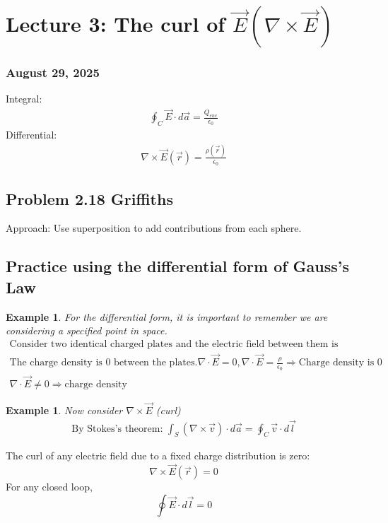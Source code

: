 \documentclass{article}
\newtheorem{example}[theorem]{Example}
\begin{document}
\section{Lecture 3: The curl of $\vec{E}(\nabla\times\vec{E})$}
\subsubsection*{August 29, 2025}
\begin{conceptbox}
Integral:
\begin{align*}
    \oint_C \vec{E} \cdot d\vec{a} = \frac{Q_{enc}}{\epsilon_0}
\end{align*}
Differential:
\begin{align*}
    \nabla\times\vec{E}(\vec{r}) = \frac{\rho(\vec{r})}{\epsilon_0}
\end{align*}
\end{conceptbox}

\subsection{Problem 2.18 Griffiths}
Approach: Use superposition to add contributions from each sphere.

\subsection{Practice using the differential form of Gauss's Law}
\begin{example}
    For the differential form, it is important to remember we are considering a specified point in space.
\begin{align*}
    \text{Consider two identical charged plates and the electric field between them is constant.} \\
    \text{The charge density is $0$ between the plates.} \nabla\cdot\vec{E}=0, \nabla\cdot\vec{E}=\frac{\rho}{\epsilon_0} \Rightarrow \text{Charge density is 0} \\
    \nabla\cdot\vec{E}\neq0 \Rightarrow \text{charge density}
\end{align*}
\end{example}

\begin{example}
    Now consider $\nabla\times\vec{E}$ (curl)
    \begin{align*}
        \text{By Stokes's theorem: } \int_S (\nabla \times \vec{v}) \cdot d\vec{a} = \oint_C \vec{v} \cdot d\vec{l}
    \end{align*}
\end{example}
\begin{conceptbox}
The curl of any electric field due to a fixed charge distribution is zero:
\[
\nabla \times \vec{E}(\vec{r}) = 0
\]
For any closed loop,
\[
\oint \vec{E} \cdot d\vec{l} = 0
\]
\end{conceptbox}
\end{document}
